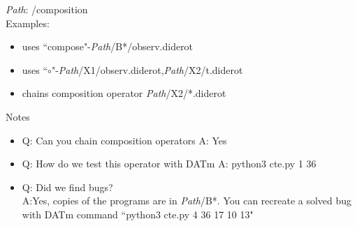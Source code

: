 \textit{Path}: \exs{}/composition\\
{Examples}:
\begin{itemize}[noitemsep]
\item uses ``compose"-\textit{Path}/B*/observ.diderot 
\item uses ``$\circ$"-\textit{Path}/X1/observ.diderot,\textit{Path}/X2/t.diderot
\item chains composition operator \textit{Path}/X2/*.diderot
\end{itemize}
{Notes}
\begin{itemize}[noitemsep]
\item  Q: Can you chain composition operators  A: Yes
\item Q: How do we test this operator with DATm A: python3 cte.py 1  36
\item Q: Did we find bugs? \\
A:Yes, copies of the programs are in \textit{Path}/B*. You can recreate a solved bug with DATm command ``python3 cte.py 4  36 17 10 13"\\
\end{itemize}